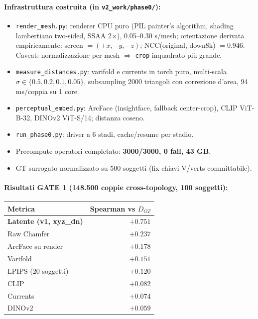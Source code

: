\documentclass[11pt,a4paper]{article}
\begin{document}
\paragraph{Infrastruttura costruita (in \texttt{v2\_work/phase0/}):}
\begin{itemize}
\item \texttt{render\_mesh.py}: renderer CPU puro (PIL painter's algorithm, shading
      lambertiano two-sided, SSAA 2$\times$), 0.05--0.30 s/mesh; orientazione derivata
      empiricamente: screen $=(+x,-y,-z)$; NCC(original, down8k) $=0.946$.
      Caveat: normalizzazione per-mesh $\Rightarrow$ \texttt{crop} inquadrato pi\`u grande.
\item \texttt{measure\_distances.py}: varifold e currents in torch puro, multi-scala
      $\sigma \in \{0.5,0.2,0.1,0.05\}$, subsampling 2000 triangoli con correzione d'area,
      94 ms/coppia su 1 core.
\item \texttt{perceptual\_embed.py}: ArcFace (insightface, fallback center-crop),
      CLIP ViT-B-32, DINOv2 ViT-S/14; distanza coseno.
\item \texttt{run\_phase0.py}: driver a 6 stadi, cache/resume per stadio.
\item Precompute operatori completato: \textbf{3000/3000, 0 fail, 43 GB}.
\item GT surrogato normalizzato su 500 soggetti (fix chiavi V/verts committabile).
\end{itemize}

\paragraph{Risultati GATE 1 (148.500 coppie cross-topology, 100 soggetti):}

\begin{center}
\begin{tabular}{lr}
\toprule
Metrica & Spearman vs $D_{GT}$ \\
\midrule
\textbf{Latente (v1, xyz\_dn)} & $\mathbf{+0.751}$ \\
Raw Chamfer                  & $+0.237$ \\
ArcFace su render            & $+0.178$ \\
Varifold                     & $+0.151$ \\
LPIPS (20 soggetti)          & $+0.120$ \\
CLIP                         & $+0.082$ \\
Currents                     & $+0.074$ \\
DINOv2                       & $+0.059$ \\
\bottomrule
\end{tabular}
\end{center}
\end{document}
